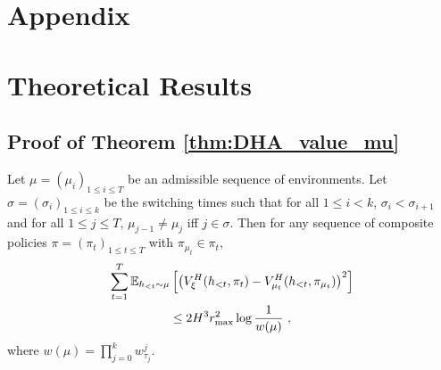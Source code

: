 \newpage
\section{Appendix}

\section{Theoretical Results}
\label{appendix:theory}

\subsection{Proof of Theorem \ref{thm:DHA_value_mu}}

\begin{T1}
    Let $\mu = (\mu_i)_{1 \leq i \leq T}$ be an admissible sequence of environments. 
    Let $\sigma = (\sigma_i)_{1 \leq i \leq k}$ be the switching times such that for all $1 \leq i < k$, $\sigma_i < \sigma_{i+1}$ and for all $1 \leq j \leq T$, $\mu_{j-1} \neq \mu_{j}$ iff $j \in \sigma$. 
    Then for any sequence of composite policies $\pi = (\pi_t)_{1 \leq t \leq T}$ with $\pi_{\mu_t} \in \pi_t$,
    \begin{multline}
        \sum_{t=1}^{T} \mathbb{E}_{h_{<t} \sim \mu} \left[ \left( V_{\xi}^{H}(h_{<t}, \pi_t) - V_{\mu_{t}}^{H}(h_{<t}, \pi_{\mu_t}) \right)^2 \right] \\
        \leq 2 H^3 r_{\max}^2 \log \frac{1}{w(\mu)}~,
    \end{multline}
    where $w(\mu) = \prod_{j=0}^{k} w_{\tau_j}^j$. 
\end{T1}

